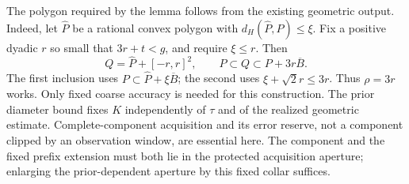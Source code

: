 The polygon required by the lemma follows from the existing geometric
output. Indeed, let $\widehat P$ be a rational convex polygon with
$d_H(\widehat P,P)\le\xi$. Fix a positive dyadic $r$ so small that
$3r+t<g$, and require $\xi\le r$. Then
\begin{equation}\label{eq:protected-polygon-construction}
 Q=\widehat P+[-r,r]^2,\qquad
 P\subset Q\subset P+3r\overline B.
\end{equation}
The first inclusion uses $P\subset\widehat P+\xi\overline B$;
the second uses $\xi+\sqrt2r\le3r$. Thus $\rho=3r$ works.
Only fixed coarse accuracy is needed for this construction. The
prior diameter bound fixes $K$ independently of $\tau$ and of the
realized geometric estimate. Complete-component acquisition and its
error reserve, not a component clipped by an observation window,
are essential here. The component and the fixed prefix extension
must both lie in the protected acquisition aperture; enlarging the
prior-dependent aperture by this fixed collar suffices.

